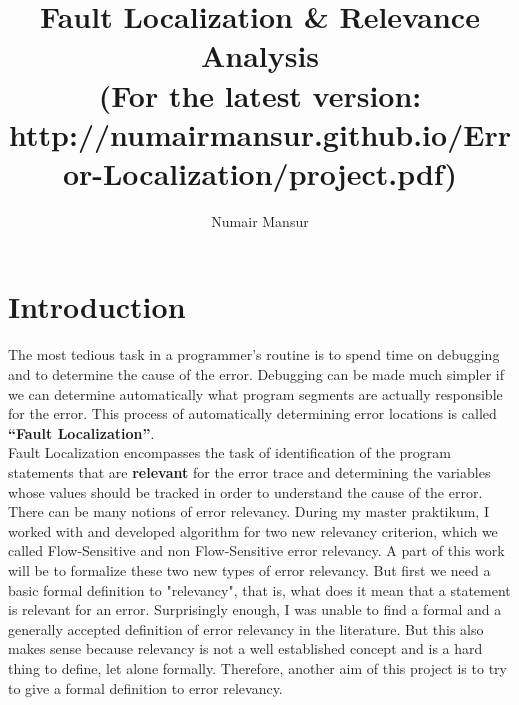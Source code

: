 \documentclass{article}
\title{Fault Localization \& Relevance Analysis \\ {\tiny (For the latest version: http://numairmansur.github.io/Error-Localization/project.pdf)}}
\author{Numair Mansur}
\begin{document}
\maketitle
\section{Introduction}
The most tedious task in a programmer’s routine is to spend time on debugging and to determine the cause of the error. Debugging can be made much simpler if we can determine automatically what program segments are actually responsible for the error. This process of automatically determining error locations is called \textbf{“Fault Localization”}.
\\
Fault Localization encompasses the task of identification of the program statements that are \textbf{relevant} for the error trace and determining the variables whose values should be tracked in order to understand the cause of the error. 
\\
There can be many notions of error relevancy. During my master praktikum, I worked with and developed algorithm for two new relevancy criterion, which we called Flow-Sensitive and non Flow-Sensitive error relevancy. A part of this work will be to formalize these two new types of error relevancy. But first we need a basic formal definition to "relevancy", that is, what does it mean that a statement is relevant for an error. Surprisingly enough, I was unable to find a formal and a generally accepted definition of error relevancy in the literature. But this also makes sense because relevancy is not a well established concept and is a hard thing to define, let alone formally. Therefore, another aim of this project is to try to give a formal definition to error relevancy.
\end{document}
